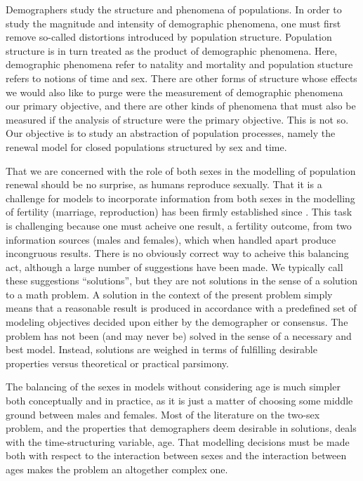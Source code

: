 Demographers study the structure and phenomena of populations. In order to study
the magnitude and intensity of demographic phenomena, one must first remove
so-called distortions introduced by population structure. Population structure
is in turn treated as the product of demographic phenomena. Here,
demographic phenomena refer to natality and mortality and population stucture
refers to notions of time and sex. There are other forms of structure whose
effects we would also like to purge were the measurement of demographic phenomena 
our primary objective, and there are other kinds of phenomena that must also be
measured if the analysis of structure were the primary objective. This is not
so. Our objective is to study an abstraction of population processes, namely the
renewal model for closed populations structured by sex and time.

That we are concerned with the role of both sexes in the modelling of population
renewal should be no surprise, as humans reproduce sexually. That it is a
challenge for models to incorporate information from both sexes in the modelling
of fertility (marriage, reproduction) has been firmly established since
\citet{karmel1947relations}. This task is challenging because one must acheive
one result, a fertility outcome, from two information sources (males and
females), which when handled apart produce incongruous results. There is no
obviously correct way to acheive this balancing act, although a large number of
suggestions have been made. We typically call these suggestions ``solutions'',
but they are not solutions in the sense of a solution to a math problem. A
solution in the context of the present problem simply means that a reasonable
result is produced in accordance with a predefined set of modeling objectives
decided upon either by the demographer or consensus. The problem has not been
(and may never be) solved in the sense of a necessary and best model. Instead,
solutions are weighed in terms of fulfilling desirable properties versus theoretical 
or practical parsimony.

The balancing of the sexes in models without considering age is
much simpler both conceptually and in practice, as it is just a matter of
choosing some middle ground between males and females. Most of the literature on
the two-sex problem, and the properties that demographers deem desirable in
solutions, deals with the time-structuring variable, age. That modelling
decisions must be made both with respect to the interaction between sexes and
the interaction between ages makes the problem an altogether complex one. 

